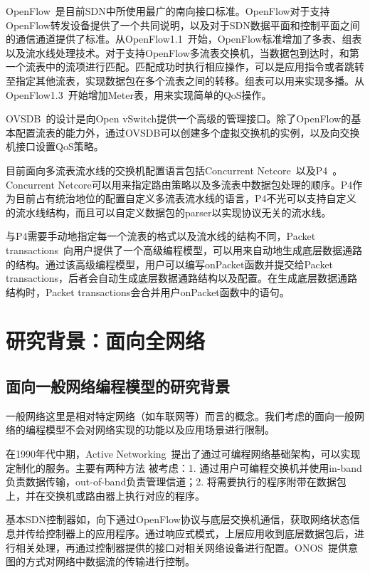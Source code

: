 OpenFlow~\cite{mckeown2008openflow}是目前SDN中所使用最广的南向接口标准。OpenFlow对于支持OpenFlow转发设备提供了一个共同说明，以及对于SDN数据平面和控制平面之间的通信通道提供了标准。从OpenFlow1.1~\cite{openflow1-1}开始，OpenFlow标准增加了多表、组表以及流水线处理技术。对于支持OpenFlow多流表交换机，当数据包到达时，和第一个流表中的流项进行匹配。匹配成功时执行相应操作，可以是应用指令或者跳转至指定其他流表，实现数据包在多个流表之间的转移。组表可以用来实现多播。从OpenFlow1.3~\cite{openflow1-3}开始增加Meter表，用来实现简单的QoS操作。

OVSDB~\cite{pfaff2013open}的设计是向Open vSwitch提供一个高级的管理接口。除了OpenFlow的基本配置流表的能力外，通过OVSDB可以创建多个虚拟交换机的实例，以及向交换机接口设置QoS策略。

目前面向多流表流水线的交换机配置语言包括Concurrent Netcore~\cite{schlesinger2014concurrent}以及P4~\cite{P4}。Concurrent Netcore可以用来指定路由策略以及多流表中数据包处理的顺序。P4作为目前占有统治地位的配置自定义多流表流水线的语言，P4不光可以支持自定义的流水线结构，而且可以自定义数据包的parser以实现协议无关的流水线。


与P4需要手动地指定每一个流表的格式以及流水线的结构不同，Packet transactions~\cite{sivaraman2016packet}向用户提供了一个高级编程模型，可以用来自动地生成底层数据通路的结构。通过该高级编程模型，用户可以编写onPacket函数并提交给Packet transactions，后者会自动生成底层数据通路结构以及配置。在生成底层数据通路结构时，Packet transactions会合并用户onPacket函数中的语句。


\section{研究背景：面向全网络}


\subsection{面向一般网络编程模型的研究背景}


一般网络这里是相对特定网络（如车联网等）而言的概念。我们考虑的面向一般网络的编程模型不会对网络实现的功能以及应用场景进行限制。

在1990年代中期，Active Networking~\cite{tennenhouse1997survey,tennenhouse1996towards}提出了通过可编程网络基础架构，可以实现定制化的服务。主要有两种方法
被考虑：1. 通过用户可编程交换机并使用in-band负责数据传输，out-of-band负责管理信道；2. 将需要执行的程序附带在数据包上，并在交换机或路由器上执行对应的程序。

基本SDN控制器如\cite{gude2008nox,erickson2013beacon,medved2014opendaylight,shalimov2013advanced}，向下通过OpenFlow协议与底层交换机通信，获取网络状态信息并传给控制器上的应用程序。通过响应式模式，上层应用收到底层数据包后，进行相关处理，再通过控制器提供的接口对相关网络设备进行配置。ONOS~\cite{berde2014onos}提供意图的方式对网络中数据流的传输进行控制。


